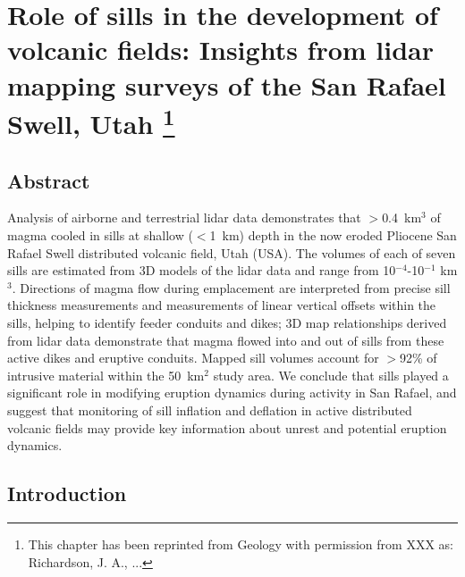 \chapter[Role of sills in the development of volcanic fields: Insights from lidar mapping surveys of the San Rafael Swell, Utah]{
Role of sills in the development of volcanic fields: Insights from lidar mapping surveys of the San Rafael Swell, Utah \footnote{This chapter has been reprinted from Geology with permission from XXX as: Richardson, J. A., ...}}\label{ch_sills}


\renewcommand*{\FigPath}{figures/chapter-sills}

\section{Abstract}

Analysis of airborne and terrestrial lidar data demonstrates that $>$0.4~km$^3$ of magma cooled in sills at shallow ($<$1~km) depth in the now eroded Pliocene San Rafael Swell distributed volcanic field, Utah (USA). The volumes of each of seven sills are estimated from 3D models of the lidar data and range from 10$^{-4}$-10$^{-1}$ km$^3$. Directions of magma flow during emplacement are interpreted from precise sill thickness measurements and measurements of linear vertical offsets within the sills, helping to identify feeder conduits and dikes; 3D map relationships derived from lidar data demonstrate that magma flowed into and out of sills from these active dikes and eruptive conduits. Mapped sill volumes account for $>$92\% of intrusive material within the 50~km$^2$ study area. We conclude that sills played a significant role in modifying eruption dynamics during activity in San Rafael, and suggest that monitoring of sill inflation and deflation in active distributed volcanic fields may provide key information about unrest and potential eruption dynamics.


\section{Introduction}

